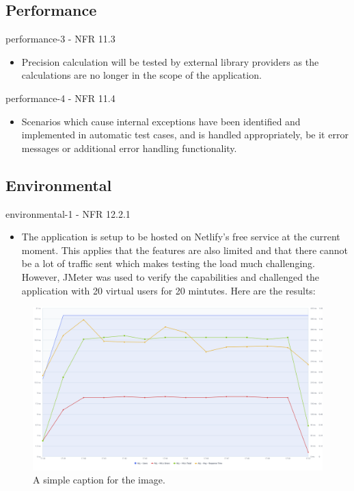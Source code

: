 \documentclass[12pt, titlepage]{article}
\begin{document}
\subsection{Performance}

performance-3 - NFR 11.3
\begin{itemize}
\item Precision calculation will be tested by external library providers as the calculations are no longer in the scope of the application.
\end{itemize}

performance-4 - NFR 11.4
\begin{itemize}
\item Scenarios which cause internal exceptions have been identified and implemented in automatic test cases, and is handled appropriately, be it error messages or additional error handling functionality.
\end{itemize}

\subsection{Environmental}

environmental-1 - NFR 12.2.1

\begin{itemize}
    \item The application is setup to be hosted on Netlify's free service at the current moment. This applies that the features are also limited and that there cannot be a lot of traffic sent which makes testing the load much challenging. However, JMeter was used to verify the capabilities and challenged the application with 20 virtual users for 20 mintutes. Here are the results:
\end{itemize}

\begin{figure}[h]
\centering
\includegraphics[width=1\textwidth]{new-chart-1-e13fd45c-e039-48c1-bb7f-3b555841f526.png}
\caption{A simple caption for the image.}
\label{fig:myimage}
\end{figure}
\end{document}
